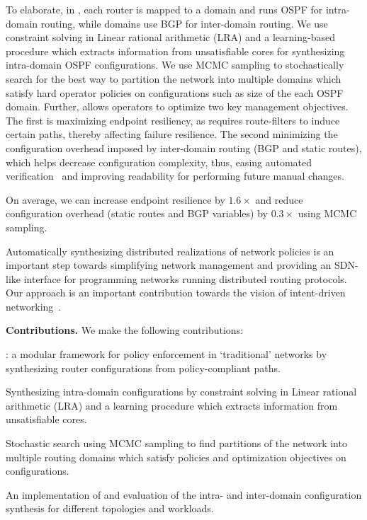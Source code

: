 To elaborate, in \name, each router is mapped to a domain and runs
OSPF for intra- domain routing, while domains use BGP for inter-domain
routing. We use constraint solving in Linear rational arithmetic (LRA)
and a learning-based procedure which extracts information from
unsatisfiable cores for synthesizing intra-domain OSPF configurations.
We use MCMC sampling to stochastically search for the best way to
partition the network into multiple domains which satisfy hard
operator policies on configurations such as size of the each OSPF
domain. Further, \name allows operators to optimize two key management
objectives. The first is maximizing endpoint resiliency, as \name
requires route-filters to induce certain paths, thereby affecting
failure resilience. The second minimizing the configuration overhead imposed
by inter-domain routing (BGP and static routes), which helps decrease
configuration complexity, thus, easing automated
verification~\cite{batfish, arc, era} and improving readability for
performing future manual changes.

  On average, we can increase
endpoint resilience by $1.6\times$ and reduce configuration overhead
(static routes and BGP variables) by $0.3\times$ using MCMC sampling.


Automatically synthesizing distributed realizations 
of network policies is an
important step towards simplifying 
network management and providing an 
SDN-like interface for programming networks 
running distributed routing protocols. 
Our approach is an important
contribution towards the vision of 
intent-driven networking~\cite{intent}.

\noindent\textbf{Contributions.} We make the following contributions:
\begin{compactitemize}
	\item \name: a modular framework 
	for policy enforcement in `traditional' networks
	by synthesizing router configurations from policy-compliant paths. 
	\item Synthesizing intra-domain configurations by
	constraint solving in Linear rational arithmetic (LRA) and 
	a learning procedure which extracts information from 
	unsatisfiable cores. 
	\item Stochastic search using MCMC sampling to find 
	partitions of the network into multiple routing domains which
	satisfy policies and optimization objectives on configurations.
	\item An implementation of \name and evaluation of the 
	intra- and inter-domain configuration synthesis for different
	topologies and workloads. 
\end{compactitemize}
